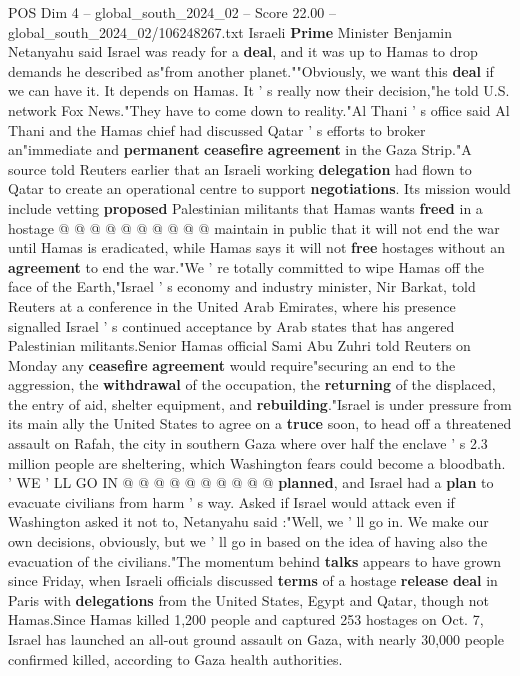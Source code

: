 \begin{textsample}{POS Dim 4 – global\_south\_2024\_02 – Score 22.00 – global\_south\_2024\_02/106248267.txt}
Israeli \textbf{Prime} Minister Benjamin Netanyahu said Israel was ready for a \textbf{deal}, and it was up to Hamas to drop demands he described as"from another planet.""Obviously, we want this \textbf{deal} if we can have it.
It depends on Hamas.
It ' s really now their decision,"he told U.S. network Fox News."They have to come down to reality."Al Thani ' s office said Al Thani and the Hamas chief had discussed Qatar ' s efforts to broker an"immediate and \textbf{permanent} \textbf{ceasefire} \textbf{agreement} in the Gaza Strip."A source told Reuters earlier that an Israeli working \textbf{delegation} had flown to Qatar to create an operational centre to support \textbf{negotiations}.
Its mission would include vetting \textbf{proposed} Palestinian militants that Hamas wants \textbf{freed} in a hostage @ @ @ @ @ @ @ @ @ @ maintain in public that it will not end the war until Hamas is eradicated, while Hamas says it will not \textbf{free} hostages without an \textbf{agreement} to end the war."We ' re totally committed to wipe Hamas off the face of the Earth,"Israel ' s economy and industry minister, Nir Barkat, told Reuters at a conference in the United Arab Emirates, where his presence signalled Israel ' s continued acceptance by Arab states that has angered Palestinian militants.Senior Hamas official Sami Abu Zuhri told Reuters on Monday any \textbf{ceasefire} \textbf{agreement} would require"securing an end to the aggression, the \textbf{withdrawal} of the occupation, the \textbf{returning} of the displaced, the entry of aid, shelter equipment, and \textbf{rebuilding}."Israel is under pressure from its main ally the United States to agree on a \textbf{truce} soon, to head off a threatened assault on Rafah, the city in southern Gaza where over half the enclave ' s 2.3 million people are sheltering, which Washington fears could become a bloodbath. ' WE ' LL GO IN @ @ @ @ @ @ @ @ @ @ \textbf{planned}, and Israel had a \textbf{plan} to evacuate civilians from harm ' s way.
Asked if Israel would attack even if Washington asked it not to, Netanyahu said :"Well, we ' ll go in.
We make our own decisions, obviously, but we ' ll go in based on the idea of having also the evacuation of the civilians."The momentum behind \textbf{talks} appears to have grown since Friday, when Israeli officials discussed \textbf{terms} of a hostage \textbf{release} \textbf{deal} in Paris with \textbf{delegations} from the United States, Egypt and Qatar, though not Hamas.Since Hamas killed 1,200 people and captured 253 hostages on Oct. 7, Israel has launched an all-out ground assault on Gaza, with nearly 30,000 people confirmed killed, according to Gaza health authorities.

\end{textsample}
